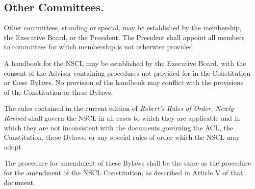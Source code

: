 \documentclass{bylaws}
\newcommand{\NSCL}{\textsc{NSCL}\xspace}
\newcommand{\ACL}{\textsc{ACL}\xspace}
\begin{document}
\begin{linenumbers}[1]
  \section{Other Committees.}
  Other committees, standing or special, may be established by the
  membership, the Executive Board, or the President. The President shall
  appoint all members to committees for which membership is not
  otherwise provided.\\

  \pagebreak

  A handbook for the \NSCL may be established by the Executive Board,
  with the consent of the Advisor containing procedures not provided for
  in the Constitution or these Bylaws. No provision of the handbook may
  conflict with the provisions of the Constitution or these Bylaws.\\

  
  The rules contained in the current edition of \textit{Robert's Rules
    of Order, Newly Revised} shall govern the \NSCL in all cases to
  which they are applicable and in which they are not inconsistent with
  the documents governing the \ACL, the Constitution, these Bylaws, or
  any special rules of order which the \NSCL may adopt.\\

  
  The procedure for amendment of these Bylaws shall be the same as the
  procedure for the amendment of the \NSCL Constitution, as described in
  Article V of that document.
  
\end{linenumbers}
\end{document}
